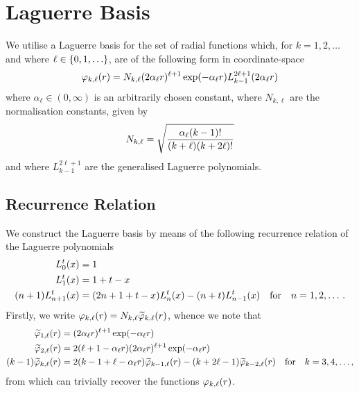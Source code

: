 \documentclass[]{article}
\begin{document}
\clearpage
\section{Laguerre Basis}
\label{sec:laguerre-basis}

We utilise a Laguerre basis for the set of radial functions which,
for $k = 1, 2, \dotsc$ and where $\ell \in \lrset{0, 1, \dotsc}$, are of the
following form in coordinate-space
\begin{equation*}
  \varphi_{k, \ell}\lr{r}
  =
  N_{k, \ell}
  \lr
  {
    2
    \alpha_{\ell}
    r
  }^{\ell + 1}
  \exponential\lr
  {
    -
    \alpha_{\ell}
    r
  }
  L_{k - 1}^{2 \ell + 1}\lr{2 \alpha_{\ell} r}
\end{equation*}
where $\alpha_{\ell} \in (0, \infty)$ is an arbitrarily chosen constant,
where $N_{k, \ell}$ are the normalisation constants, given by
\begin{equation*}
  N_{k, \ell}
  =
  \sqrt
  {
    \dfrac
    {
      \alpha_{\ell}
      (k - 1)!
    }
    {
      (k + \ell)
      (k + 2 \ell)!
    }
  }
\end{equation*}
and where $L_{k - 1}^{2 \ell + 1}$ are the generalised Laguerre polynomials.

\subsection{Recurrence Relation}
\label{sec:recurrence-relation}

We construct the Laguerre basis by means of the following recurrence relation of
the Laguerre polynomials
\begin{alignat*}{2}
  L_{0}^{t}\lr{x}
  {}={}
  &
  1
  \\
  L_{1}^{t}\lr{x}
  {}={}
  &
  1
  +
  t
  -
  x
  \\
  \lr{n + 1}
  L_{n + 1}^{t}\lr{x}
  {}={}
  &
  \lr
  {
    2
    n
    +
    1
    +
    t
    -
    x
  }
  L_{n}^{t}\lr{x}
  -
  \lr{n + t}
  L_{n - 1}^{t}\lr{x}
  \qq{for}
  n = 1, 2, \dotsc.
\end{alignat*}
Firstly, we write
$\varphi_{k, \ell}(r) = N_{k, \ell}\widetilde{\varphi}_{k, \ell}(r)$,
whence we note that
\begin{alignat*}{2}
  \widetilde{\varphi}_{1, \ell}\lr{r}
  {}={}
  &
  \lr
  {
    2
    \alpha_{\ell}
    r
  }^{\ell + 1}
  \exponential\lr
  {
    -
    \alpha_{\ell}
    r
  }
  \\
  \widetilde{\varphi}_{2, \ell}\lr{r}
  {}={}
  &
  2
  \lr
  {
    \ell
    +
    1
    -
    \alpha_{\ell}
    r
  }
  \lr
  {
    2
    \alpha_{\ell}
    r
  }^{\ell + 1}
  \exponential\lr
  {
    -
    \alpha_{\ell}
    r
  }
  \\
  \lr{k - 1}
  \widetilde{\varphi}_{k, \ell}\lr{r}
  {}={}
  &
  2
  \lr
  {
    k
    -
    1
    +
    \ell
    -
    \alpha_{\ell}
    r
  }
  \widetilde{\varphi}_{k - 1, \ell}\lr{r}
  -
  \lr
  {
    k
    +
    2
    \ell
    -
    1
  }
  \widetilde{\varphi}_{k - 2, \ell}\lr{r}
  \qq{for}
  k = 3, 4, \dotsc,
\end{alignat*}
from which can trivially recover the functions $\varphi_{k, \ell}(r)$.
\end{document}
